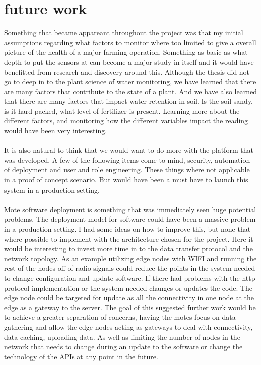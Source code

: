 \documentclass[]{uiophd}
\begin{document}
\section{future work}
Something that became appareant throughout the project was that my initial assumptions regarding what factors to monitor where too limited to give  a overall picture of the health of a major farming operation. Something as basic as what depth to put the sensors at can become a  major study in itself and it would have benefitted from research and discovery around this. Although the thesis did not go to deep in to the plant science of water monitoring, we have learned that there are many factors that contribute to the state of a plant. And we have also learned that there are many factors that impact water retention in soil. Is the soil sandy, is it hard packed, what level of fertilizer is present. Learning more about the different factors, and monitoring how the different variables impact the reading would have been very interesting.
\\\\
It is also natural to think that we would want to do more with the platform that was developed. A few of the following items come to mind, security, automation of deployment and user and role engineering. These things where not applicable in a proof of concept scenario. But would have been a must have to  launch this system in a production setting.
\\\\
Mote software deployment is something that was immediately seen huge potential problems. The deployment model for software could have been a massive problem in a production setting. I had some ideas on how to improve this, but none that where possible to implement with the architecture chosen for the project. Here it would be interesting to invest more time in to the data transfer protocol and the network topology. As an example utilizing edge nodes with WIFI and running the rest of the nodes off of radio signals could reduce the points in the system needed to change configuration and update software. If there had problems with the http protocol implementation or the system needed changes or updates the code. The edge node could be targeted for update as all the connectivity in one node at the edge as a gateway to the server. The goal of this suggested further work would be to achieve a greater separation of concerns, having the motes focus on data gathering and allow the edge nodes acting as gateways to deal with connectivity, data caching, uploading data. As well as limiting the number of nodes in the network that needs to change during an update to the software or change the technology of the APIs at any point in the future.
\end{document}
